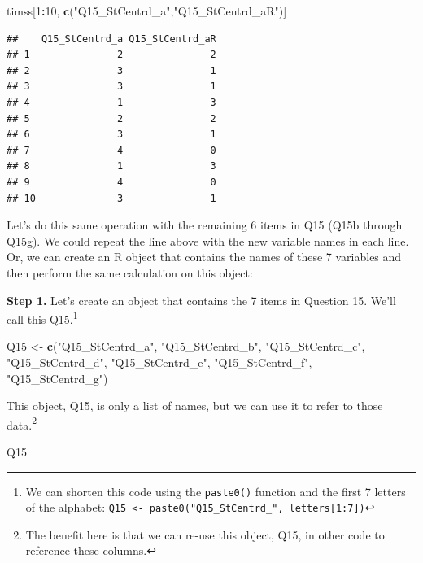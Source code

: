\documentclass[
]{article}
\newenvironment{Shaded}{\begin{snugshade}}{\end{snugshade}}
\newcommand{\DecValTok}[1]{\textcolor[rgb]{0.00,0.00,0.81}{#1}}
\newcommand{\KeywordTok}[1]{\textcolor[rgb]{0.13,0.29,0.53}{\textbf{#1}}}
\newcommand{\NormalTok}[1]{#1}
\newcommand{\OperatorTok}[1]{\textcolor[rgb]{0.81,0.36,0.00}{\textbf{#1}}}
\newcommand{\StringTok}[1]{\textcolor[rgb]{0.31,0.60,0.02}{#1}}
\begin{document}
\begin{Shaded}
\begin{Highlighting}[]
\NormalTok{timss[}\DecValTok{1}\OperatorTok{:}\DecValTok{10}\NormalTok{, }\KeywordTok{c}\NormalTok{(}\StringTok{"Q15_StCentrd_a"}\NormalTok{,}\StringTok{"Q15_StCentrd_aR"}\NormalTok{)]}
\end{Highlighting}
\end{Shaded}

\begin{verbatim}
##    Q15_StCentrd_a Q15_StCentrd_aR
## 1               2               2
## 2               3               1
## 3               3               1
## 4               1               3
## 5               2               2
## 6               3               1
## 7               4               0
## 8               1               3
## 9               4               0
## 10              3               1
\end{verbatim}

Let's do this same operation with the remaining 6 items in Q15 (Q15b through Q15g). We could repeat the line above with the new variable names in each line. Or, we can create an R object that contains the names of these 7 variables and then perform the same calculation on this object:

\textbf{Step 1.} Let's create an object that contains the 7 items in Question 15. We'll call this Q15.\footnote{We can shorten this code using the \texttt{paste0()} function and the first 7 letters of the alphabet: \texttt{Q15\ \textless{}-\ paste0("Q15\_StCentrd\_",\ letters{[}1:7{]})}}

\begin{Shaded}
\begin{Highlighting}[]
\NormalTok{Q15 <-}\StringTok{ }\KeywordTok{c}\NormalTok{(}\StringTok{"Q15_StCentrd_a"}\NormalTok{, }\StringTok{"Q15_StCentrd_b"}\NormalTok{, }\StringTok{"Q15_StCentrd_c"}\NormalTok{, }\StringTok{"Q15_StCentrd_d"}\NormalTok{, }
        \StringTok{"Q15_StCentrd_e"}\NormalTok{, }\StringTok{"Q15_StCentrd_f"}\NormalTok{, }\StringTok{"Q15_StCentrd_g"}\NormalTok{)}
\end{Highlighting}
\end{Shaded}

This object, Q15, is only a list of names, but we can use it to refer to those data.\footnote{The benefit here is that we can re-use this object, Q15, in other code to reference these columns.}

\begin{Shaded}
\begin{Highlighting}[]
\NormalTok{Q15}
\end{Highlighting}
\end{Shaded}
\end{document}
